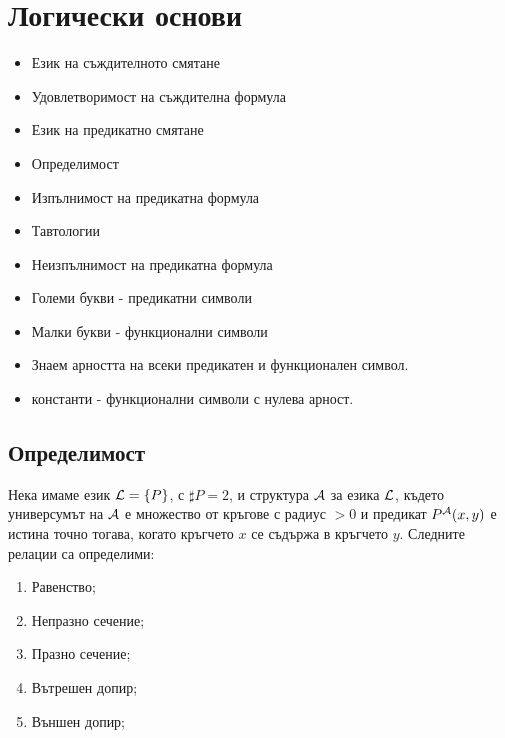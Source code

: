 \chapter{Логически основи}


\begin{itemize}
\item
  Език на съждителното смятане
\item
  Удовлетворимост на съждителна формула
\item
  Език на предикатно смятане
\item
  Определимост
\item
  Изпълнимост на предикатна формула
\item
  Тавтологии
\item
  Неизпълнимост на предикатна формула
\end{itemize}

\begin{itemize}
\item
  Големи букви - предикатни символи
\item
  Малки букви - функционални символи
\item
  Знаем арността на всеки предикатен и функционален символ.
\item
  константи - функционални символи с нулева арност.
\end{itemize}

\section{Определимост}



\begin{problem}
  Нека имаме език $\mathcal{L} = \{P\}$, с $\sharp P = 2$, и структура $\mathcal{A}$ за езика $\mathcal{L}$, където
  универсумът на $\mathcal{A}$ е множество от кръгове с радиус $> 0$ и предикат $P^{\mathcal{A}}(x,y)$ е истина точно тогава, когато кръгчето $x$ се съдържа в кръгчето $y$.
  Следните релации са определими:
  \begin{enumerate}[1)]
  \item
    Равенство;
  \item
    Непразно сечение;
  \item
    Празно сечение;
  \item
    Вътрешен допир;
  \item
    Външен допир;
  \end{enumerate}
\end{problem}


